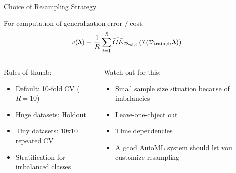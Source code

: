 \begin{frame}{Choice of Resampling Strategy}
  
  For computation of generalization error / cost:
  \begin{equation}
    c(\pmb{\lambda}) = \frac{1}{R}\sum_{i = 1}^R \widehat{GE}_{\mathcal{D}_{\text{val}, i}}\left(\mathcal{I}(\mathcal{D}_{\text{train}, i}, \pmb{\lambda})\right)
  \end{equation}

  \vspace{1em}
  \begin{columns}
    \begin{column}{0.5\textwidth}
    Rules of thumb:
    \begin{itemize}
      \item Default: 10-fold CV ($R=10$)
      \item Huge datasets: Holdout
      \item Tiny datasets: 10x10 repeated CV
      \item Stratification for imbalanced classes
    \end{itemize}
    \end{column}
    
    \begin{column}{0.5\textwidth}
 Watch out for this:       
    \begin{itemize}
      \item Small sample size situation because of imbalancies    
      \item Leave-one-object out
      \item Time dependencies
      \item A good AutoML system should let you customize resampling
    \end{itemize}
    \end{column}
    \end{columns}
    
\end{frame}

